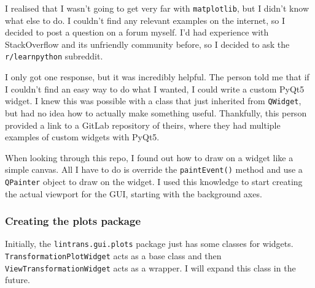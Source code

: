 \documentclass[../main.tex]{subfiles}
\begin{document}
I realised that I wasn't going to get very far with \texttt{matplotlib}, but I didn't know what else to do. I couldn't find any relevant examples on the internet, so I decided to post a question on a forum myself. I'd had experience with StackOverflow and its unfriendly community before, so I decided to ask the \texttt{r/learnpython} subreddit\cite{reddit-framework-question}.

I only got one response, but it was incredibly helpful. The person told me that if I couldn't find an easy way to do what I wanted, I could write a custom PyQt5 widget. I knew this was possible with a class that just inherited from \texttt{QWidget}, but had no idea how to actually make something useful. Thankfully, this person provided a link to a GitLab repository of theirs, where they had multiple examples of custom widgets with PyQt5\cite{gitlab-custom-widgets}.

When looking through this repo, I found out how to draw on a widget like a simple canvas. All I have to do is override the \texttt{paintEvent()} method and use a \texttt{QPainter} object to draw on the widget. I used this knowledge to start creating the actual viewport for the GUI, starting with the background axes.

\subsubsection{Creating the plots package\label{development:visualizing-matrices:creating-the-plots-package}}

Initially, the \texttt{lintrans.gui.plots} package just has some classes for widgets. \texttt{TransformationPlotWidget} acts as a base class and then \texttt{ViewTransformationWidget} acts as a wrapper. I will expand this class in the future.


\end{document}
